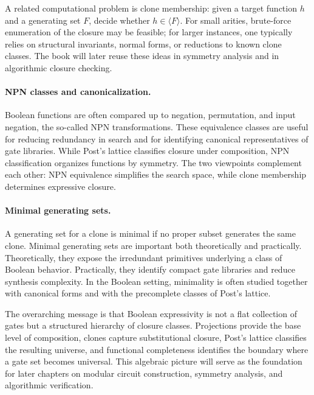 \documentclass[11pt]{article}
\begin{document}
A related computational problem is clone membership: given a target function $h$ and a generating set $F$, decide whether $h \in \langle F\rangle$. For small arities, brute-force enumeration of the closure may be feasible; for larger instances, one typically relies on structural invariants, normal forms, or reductions to known clone classes. The book will later reuse these ideas in symmetry analysis and in algorithmic closure checking.

\paragraph{NPN classes and canonicalization.}
Boolean functions are often compared up to negation, permutation, and input negation, the so-called NPN transformations. These equivalence classes are useful for reducing redundancy in search and for identifying canonical representatives of gate libraries. While Post's lattice classifies closure under composition, NPN classification organizes functions by symmetry. The two viewpoints complement each other: NPN equivalence simplifies the search space, while clone membership determines expressive closure.

\paragraph{Minimal generating sets.}
A generating set for a clone is minimal if no proper subset generates the same clone. Minimal generating sets are important both theoretically and practically. Theoretically, they expose the irredundant primitives underlying a class of Boolean behavior. Practically, they identify compact gate libraries and reduce synthesis complexity. In the Boolean setting, minimality is often studied together with canonical forms and with the precomplete classes of Post's lattice.

The overarching message is that Boolean expressivity is not a flat collection of gates but a structured hierarchy of closure classes. Projections provide the base level of composition, clones capture substitutional closure, Post's lattice classifies the resulting universe, and functional completeness identifies the boundary where a gate set becomes universal. This algebraic picture will serve as the foundation for later chapters on modular circuit construction, symmetry analysis, and algorithmic verification.
\end{document}
